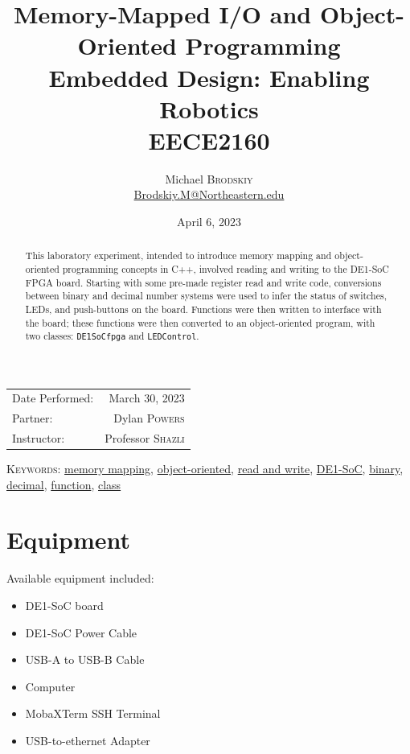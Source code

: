 \documentclass[
	letterpaper, %
	10pt, %
]{CSUniSchoolLabReport}
\title{Memory-Mapped I/O and Object-Oriented Programming\\ Embedded Design: Enabling Robotics \\ EECE2160} %
\author{Michael \textsc{Brodskiy}\\ \small \href{mailto:Brodskiy.M@Northeastern.edu}{Brodskiy.M@Northeastern.edu}}
\date{April 6, 2023} %
\begin{document}
\maketitle %

\begin{center}
	\begin{tabular}{l r}
		Date Performed: & March 30, 2023 \\ %
        Partner: & Dylan \textsc{Powers} \\ %
		Instructor: & Professor \textsc{Shazli} %
	\end{tabular}
\end{center}

\newpage

\begin{abstract}

  This laboratory experiment, intended to introduce memory mapping and object-oriented programming concepts in C++, involved reading and writing to the DE1-SoC FPGA board. Starting with some pre-made register read and write code, conversions between binary and decimal number systems were used to infer the status of switches, LEDs, and push-buttons on the board. Functions were then written to interface with the board; these functions were then converted to an object-oriented program, with two classes: \texttt{DE1SoCfpga} and \texttt{LEDControl}.

\end{abstract}

\begin{flushleft}

  \textsc{Keywords:} \underline{memory mapping}, \underline{object-oriented}, \underline{read and write}, \underline{DE1-SoC}, \underline{binary}, \underline{decimal}, \underline{function}, \underline{class}

\end{flushleft}

\newpage

\section{Equipment}

\hspace{.5 in} Available equipment included:\\

\begin{itemize}

  \item DE1-SoC board

  \item DE1-SoC Power Cable

  \item USB-A to USB-B Cable

  \item Computer

  \item MobaXTerm SSH Terminal

  \item USB-to-ethernet Adapter

\end{itemize}
\end{document}

